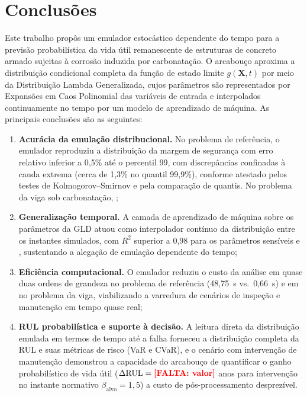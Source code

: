 \section{Conclus\~oes}\label{sec:conclusoes}

Este trabalho propôs um emulador estocástico dependente do tempo para a previsão probabilística da vida útil remanescente de estruturas de concreto armado sujeitas à corrosão induzida por carbonatação. O arcabouço aproxima a distribuição condicional completa da função de estado limite $g(\mathbf{X},t)$ por meio da Distribuição Lambda Generalizada, cujos parâmetros são representados por Expansões em Caos Polinomial das variáveis de entrada e interpolados continuamente no tempo por um modelo de aprendizado de máquina. As principais conclusões são as seguintes:

\begin{enumerate}
    \item \textbf{Acurácia da emulação distribucional.} No problema de referência, o emulador reproduziu a distribuição da margem de segurança com erro relativo inferior a 0,5\% até o percentil 99, com discrepâncias confinadas à cauda extrema (cerca de 1,3\% no quantil 99,9\%), conforme atestado pelos testes de Kolmogorov--Smirnov e pela comparação de quantis. No problema da viga sob carbonatação, ;

    \item \textbf{Generalização temporal.} A camada de aprendizado de máquina sobre os parâmetros da GLD atuou como interpolador contínuo da distribuição entre os instantes simulados, com $R^2$ superior a 0,98 para os parâmetros sensíveis e , sustentando a alegação de emulação dependente do tempo;

    \item \textbf{Eficiência computacional.} O emulador reduziu o custo da análise em quase duas ordens de grandeza no problema de referência (48,75~s vs.\ 0,66~s) e em  no problema da viga, viabilizando a varredura de cenários de inspeção e manutenção em tempo quase real;

    \item \textbf{RUL probabilística e suporte à decisão.} A leitura direta da distribuição emulada em termos de tempo até a falha forneceu a distribuição completa da RUL e suas métricas de risco (VaR e CVaR), e o cenário com intervenção de manutenção demonstrou a capacidade do arcabouço de quantificar o ganho probabilístico de vida útil ($\Delta\mathrm{RUL} = \textcolor{red}{\textbf{[FALTA: valor]}}$ anos para intervenção no instante normativo $\beta_{\mathrm{alvo}} = 1{,}5$) a custo de pós-processamento desprezível.
\end{enumerate}

